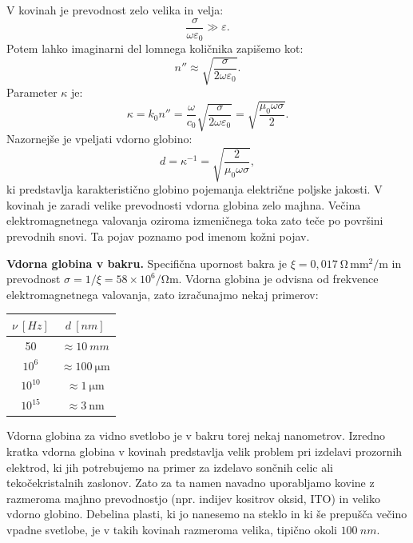 V kovinah je prevodnost zelo velika in velja:
\begin{equation}
\frac{\sigma}{\omega\varepsilon_0} \gg \varepsilon.
\label{eq:03_83}
\end{equation}
Potem lahko imaginarni del lomnega količnika zapišemo kot:
\begin{equation}
n'' \approx \sqrt{\frac{\sigma}{2 \omega \varepsilon_0}}.
\label{eq:03_84}
\end{equation}
Parameter $\kappa$ je:
\begin{equation}
\kappa = k_0 n'' = \frac{\omega}{c_0} \sqrt{\frac{\sigma}{2 \omega \varepsilon_0}} = \sqrt{\frac{\mu_0 \omega \sigma}{2}}.
\label{eq:03_85}
\end{equation}
Nazornejše je vpeljati vdorno globino:
\begin{equation}
d = \kappa^{-1} = \sqrt{\frac{2}{\mu_0 \omega \sigma}},
\label{eq:03_86}
\end{equation}
ki predstavlja karakteristično globino pojemanja električne poljske jakosti.
V kovinah je zaradi velike prevodnosti vdorna globina zelo majhna. Večina elektromagnetnega
valovanja oziroma izmeničnega toka zato teče po površini prevodnih snovi. Ta pojav poznamo pod imenom
kožni pojav.

\begin{example}{\bf Vdorna globina v bakru.}
Specifična upornost bakra je $\xi = 0,017~\si{\ohm\,\milli\metre^2/\metre}$ in 
prevodnost $\sigma = 1/\xi = 58 \times 10^6/\si{\ohm\metre}$. 
Vdorna globina je odvisna od frekvence elektro\-mag\-net\-nega valovanja, 
zato izračunajmo nekaj primerov: 
\begin{center}
\begin{tabular}{|c|c|}
\hline
$\nu~[\si{Hz}]$ & $d~[\si{nm}]$\\ \hline
50 & $\approx 10~\si{mm}$\\ \hline
$10^6$ & $\approx 100~\si{\micro\metre}$\\ \hline
$10^{10}$ & $\approx 1~\si{\micro\metre}$\\ \hline
$10^{15}$ & $\approx 3~\si{\nano\metre}$\\ \hline
\end{tabular}
\end{center}

Vdorna globina za vidno svetlobo je v bakru torej nekaj nanometrov. 
Izredno kratka vdorna globina v kovinah predstavlja velik problem pri izdelavi prozornih elektrod, 
ki jih potrebujemo na primer za izdelavo sončnih celic
ali tekočekristalnih zaslonov. Zato za ta namen navadno uporabljamo
kovine z razmeroma majhno prevodnostjo (npr. indijev 
kositrov oksid, ITO) in veliko vdorno globino. Debelina plasti, ki
jo nanesemo na steklo in ki še prepušča večino vpadne svetlobe, je 
v takih kovinah razmeroma velika, tipično 
okoli $100~\si{nm}$. 
\end{example}
